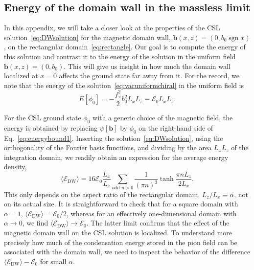 \documentclass[pdflatex,iicol,sn-mathphys-num]{sn-jnl}
\let\a=\alpha
\let\p=\phi
\newcommand{\Ea}{\mathscr{E}}%
\newcommand{\vek}[1]{\bm{#1}}%
\newcommand{\bmag}{b}%
\begin{document}
\begin{appendices}

\section{Energy of the domain wall in the massless limit}
\label{app:domainwall}

In this appendix, we will take a closer look at the properties of the CSL solution~\eqref{eq:DWsolution} for the magnetic domain wall, $\vek\bmag(x,z)=(0,\bmag_0\operatorname{sgn}x)$, on the rectangular domain~\eqref{eq:rectangle}. Our goal is to compute the energy of this solution and contrast it to the energy of the solution in the uniform field $\vek\bmag(x,z)=(0,\bmag_0)$. This will give us insight in how much the domain wall localized at $x=0$ affects the ground state far away from it. For the record, we note that the energy of the solution~\eqref{eq:vacuniformchiral} in the uniform field is
\begin{equation}
E[\p_0]=-\frac{f_\pi^2}{2}\bmag_0^2L_xL_z\equiv\Ea_0L_xL_z.
\label{eq:Evacuniform}
\end{equation}

For the CSL ground state $\p_0$ with a generic choice of the magnetic field, the energy is obtained by replacing $\psi[\vek\bmag]$ by $\p_0$ on the right-hand side of Eq.~\eqref{eq:energybound1}. Inserting the solution~\eqref{eq:DWsolution}, using the orthogonality of the Fourier basis functions, and dividing by the area $L_xL_z$ of the integration domain, we readily obtain an expression for the average energy density,
\begin{equation}
\langle\Ea_\text{DW}\rangle=16\Ea_0\frac{L_x}{L_z}\sum_{\text{odd }n>0}\frac{1}{(\pi n)^3}\tanh\frac{\pi nL_z}{2L_x}.
\label{eq:DWaverageE}
\end{equation}
This only depends on the aspect ratio of the rectangular domain, $L_z/L_x\equiv\a$, not on its actual size. It is straightforward to check that for a square domain with $\a=1$, $\langle\Ea_\text{DW}\rangle=\Ea_0/2$, whereas for an effectively one-dimensional domain with $\a\to0$, we find $\langle\Ea_\text{DW}\rangle\to\Ea_0$. The latter limit confirms that the effect of the magnetic domain wall on the CSL solution is localized. To understand more precisely how much of the condensation energy stored in the pion field can be associated with the domain wall, we need to inspect the behavior of the difference $\langle\Ea_\text{DW}\rangle-\Ea_0$ for small $\a$.


\end{appendices}
\end{document}
